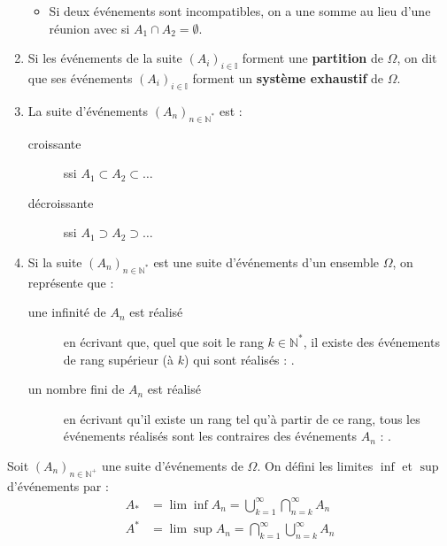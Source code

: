 \documentclass[10pt, french]{article}
\begin{document}
\begin{multicols*}{2}
\begin{definitionNOHFILLprop}
\begin{enumerate}
\begin{itemize}
		\item	Si deux événements sont incompatibles, on a une somme au lieu d'une réunion avec  si $A_{1} \cap A_{2} = \emptyset$.
		\end{itemize}
	\item	Si les événements de la suite $(A_{i})_{i \in \mathbb{I}}$ forment une \textbf{partition} de $\Omega$, on dit que ses événements $(A_{i})_{i \in \mathbb{I}}$ forment un \textbf{système exhaustif} de $\Omega$.
	\item	La suite d'événements $(A_{n})_{n \in \mathbb{N}^{\ast}}$ est : 
		\begin{description}
		\item[croissante]	ssi $A_{1} \subset A_{2} \subset \hdots$
		\item[décroissante]	ssi $A_{1} \supset A_{2} \supset \hdots$
		\end{description}
	\item	Si la suite $(A_{n})_{n \in \mathbb{N}^{\ast}}$ est une suite d'événements d'un ensemble $\Omega$, on représente que :
		\begin{description}
		\item[une infinité de $A_{n}$ est réalisé]	en écrivant que, quel que soit le rang $k \in \mathbb{N}^{\ast}$, il existe des événements de rang supérieur (à $k$) qui sont réalisés : .
		\item[un nombre fini de $A_{n}$ est réalisé]	en écrivant qu'il existe un rang tel qu'à partir de ce rang, tous les événements réalisés sont les contraires des événements $A_{n}$ : .
		\end{description}
		
\end{enumerate}
\end{definitionNOHFILLprop}

\begin{definitionNOHFILLsub}
Soit $(A_{n})_{n \in \mathbb{N}^{+}}$ une suite d'événements de $\Omega$. On défini les limites $\inf$ et $\sup$ d'événements par : 
\begin{align*}
	A_{\ast} 
	&=	\lim \inf A_{n} 
	=	\bigcup_{k = 1}^{\infty} \bigcap_{n = k}^{\infty} A_{n}	\\
	A^{\ast} 
	&=	\lim \sup A_{n} 
	=	\bigcap_{k = 1}^{\infty} \bigcup_{n = k}^{\infty} A_{n}
\end{align*}


\end{definitionNOHFILLsub}
\end{multicols*}
\end{document}
